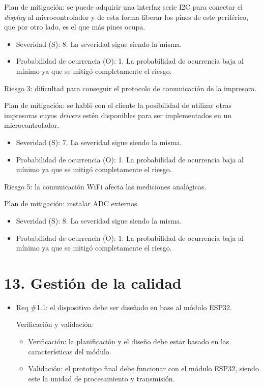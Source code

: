 \documentclass[11pt]{charter}
\begin{document}
Plan de mitigación: se puede adquirir una interfaz serie I2C para conectar el \textit{display} al microcontrolador y de esta forma liberar los pines de este periférico, que por otro lado, es el que más pines ocupa.
\begin{itemize}
\item Severidad (S): 8. La severidad sigue siendo la misma.
\item Probabilidad de ocurrencia (O): 1. La probabilidad de ocurrencia baja al mínimo ya que se mitigó completamente el riesgo.
\end{itemize}

Riesgo 3: dificultad para conseguir el protocolo de comunicación de la impresora.

Plan de mitigación: se habló con el cliente la posibilidad de utilizar otras impresoras cuyos \textit{drivers} estén disponibles para ser implementados en un microcontrolador.
\begin{itemize}
\item Severidad (S): 7. La severidad sigue siendo la misma.
\item Probabilidad de ocurrencia (O): 1. La probabilidad de ocurrencia baja al mínimo ya que se mitigó completamente el riesgo.
\end{itemize}

Riesgo 5: la comunicación WiFi afecta las mediciones analógicas.

Plan de mitigación: instalar ADC externos.
\begin{itemize}
\item Severidad (S): 8. La severidad sigue siendo la misma.
\item Probabilidad de ocurrencia (O): 1. La probabilidad de ocurrencia baja al mínimo ya que se mitigó completamente el riesgo.
\end{itemize}

\section{13. Gestión de la calidad}
\label{sec:calidad}


\begin{itemize} 
\item Req \#1.1: el dispositivo debe ser diseñado en base al módulo ESP32.

Verificación y validación:

\begin{itemize}
\item Verificación: la planificación y el diseño debe estar basado en las características del módulo.
\item Validación: el prototipo final debe funcionar con el módulo ESP32, siendo este la unidad de procesamiento y transmisión.
\end{itemize}

\end{itemize}
\end{document}
